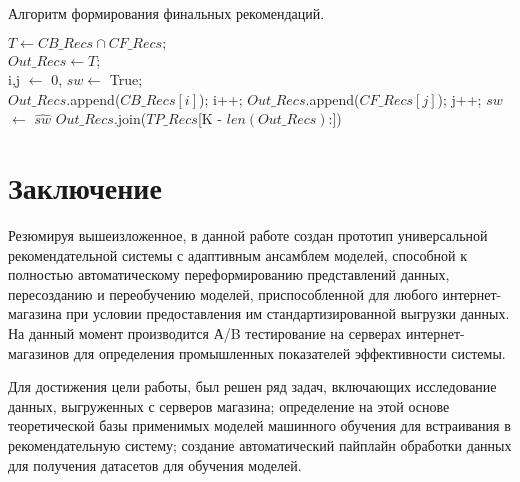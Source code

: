 \documentclass[14pt]{mmcs_article}
\begin{document}
\begin{algorithm}[H]\label{ens:ls:1}
	\caption{Алгоритм формирования финальных рекомендаций.}
	$T \leftarrow  CB\_Recs  \cap  CF\_Recs; $\\
	$Out\_Recs \leftarrow T$;\\
	i,j $\leftarrow$ 0, $sw \leftarrow$ True;\\
	{
		{
			{$Out\_Recs$.append($CB\_Recs[i]$);}
			i++;
		}
		{
			{$Out\_Recs$.append($CF\_Recs[j]$);}
			j++;
		}
		$sw$ $\leftarrow$ $\hat{sw}$
	}
	{
		$Out\_Recs$.join($TP\_Recs$[K - $len(Out\_Recs)$:])
	}
	
\end{algorithm}



\newpage
{}
\section*{Заключение}

Резюмируя вышеизложенное, в данной работе создан прототип универсальной рекомендательной системы с адаптивным ансамблем моделей, способной к полностью автоматическому переформированию представлений данных, пересозданию и переобучению моделей, приспособленной для любого интернет-магазина при условии предоставления им стандартизированной выгрузки данных. На данный момент производится А/B тестирование на серверах интернет-магазинов для определения промышленных показателей эффективности системы. 


Для достижения цели работы, был решен ряд задач, включающих исследование данных, выгруженных с серверов магазина; определение на этой основе теоретической базы применимых моделей машинного обучения для встраивания в рекомендательную систему; создание автоматический  пайплайн обработки данных для получения датасетов для обучения моделей.
\end{document}
